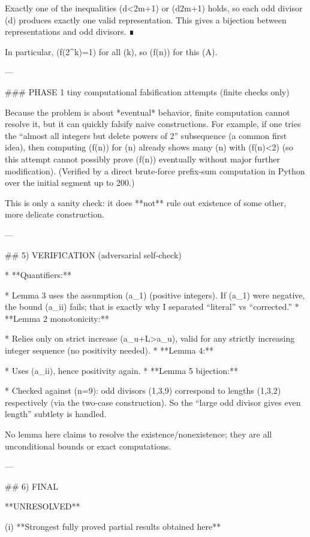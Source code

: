 Exactly one of the inequalities (d<2m+1) or (d\ge 2m+1) holds, so each odd divisor (d) produces exactly one valid representation. This gives a bijection between representations and odd divisors. ∎

In particular, (f(2^k)=1) for all (k), so (f(n)\not\to\infty) for this (A).

---

### PHASE 1 tiny computational falsification attempts (finite checks only)

Because the problem is about *eventual* behavior, finite computation cannot resolve it, but it can quickly falsify naive constructions. For example, if one tries the “almost all integers but delete powers of 2” subsequence (a common first idea), then computing (f(n)) for (n) already shows many (n) with (f(n)<2) (so this attempt cannot possibly prove (f(n)) eventually without major further modification).
(Verified by a direct brute-force prefix-sum computation in Python over the initial segment up to 200.)

This is only a sanity check: it does **not** rule out existence of some other, more delicate construction.

---

## 5) VERIFICATION (adversarial self-check)

* **Quantifiers:**

  * Lemma 3 uses the assumption (a_1) (positive integers). If (a_1) were negative, the bound (a_i\ge i) fails; that is exactly why I separated “literal” vs “corrected.”
* **Lemma 2 monotonicity:**

  * Relies only on strict increase (a_{u+L}>a_u), valid for any strictly increasing integer sequence (no positivity needed).
* **Lemma 4:**

  * Uses (a_i\ge i), hence positivity again.
* **Lemma 5 bijection:**

  * Checked against (n=9): odd divisors (1,3,9) correspond to lengths (1,3,2) respectively (via the two-case construction). So the “large odd divisor gives even length” subtlety is handled.

No lemma here claims to resolve the existence/nonexistence; they are all unconditional bounds or exact computations.

---

## 6) FINAL

**UNRESOLVED**

(i) **Strongest fully proved partial results obtained here**

